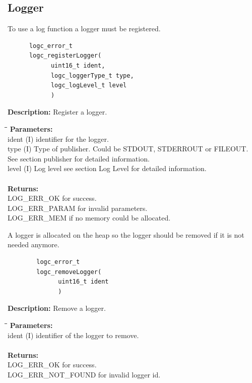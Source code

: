 \documentclass[a4paper, titlepage, 11pt]{article}
\begin{document}
\subsection{Logger}
To use a log function a logger must be registered.
\small
\begin{verbatim}
      logc_error_t
      logc_registerLogger(
            uint16_t ident,
            logc_loggerType_t type,
            logc_logLevel_t level
            )
\end{verbatim}
\normalsize
\textbf{Description:} Register a logger.
\begin{tabbing}
\hspace*{1cm}\=\hspace*{2cm}\=\hspace*{0,6cm}\= \kill
\textbf{Parameters:} \\
\> ident \> (I) identifier for the logger.\\
\> type  \> (I) Type of  publisher. Could be STDOUT, STDERROUT or FILEOUT.\\
\> \> \> See section publisher for detailed information.\\
\> level \> (I) Log level see section Log Level for detailed information.\\ \\
\textbf{Returns:} \\
\> LOG\_ERR\_OK for success.\\
\> LOG\_ERR\_PARAM for invalid parameters.\\
\> LOG\_ERR\_MEM if no memory could be allocated.\\
\end{tabbing}
A logger is allocated on the heap so the logger should be removed if it is not needed anymore.
\small
\begin{verbatim}
        logc_error_t
        logc_removeLogger(
              uint16_t ident
              )
\end{verbatim}
\normalsize
\textbf{Description:} Remove a logger.
\begin{tabbing}
\hspace*{1cm}\=\hspace*{2cm}\=\hspace*{0,6cm}\= \kill
\textbf{Parameters:} \\
\> ident \> (I) identifier of the logger to remove. \\ \\
\textbf{Returns:} \\
\> LOG\_ERR\_OK for success. \\
\> LOG\_ERR\_NOT\_FOUND for invalid logger id. \\
\end{tabbing}
\end{document}
